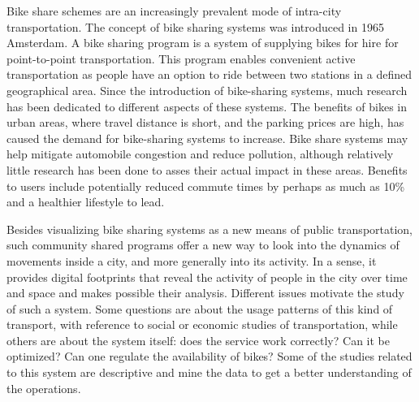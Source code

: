 \label{sec:overview}
Bike share schemes are an increasingly prevalent mode of intra-city transportation. The concept of bike sharing systems was introduced in 1965 Amsterdam. A bike sharing program is a system of supplying bikes for hire for point-to-point transportation. This program enables convenient active transportation as people have an option to ride between two stations in a defined geographical area. Since the introduction of bike-sharing systems, much research has been dedicated to different aspects of these systems. The benefits of bikes in urban areas, where travel distance is short, and the parking prices are high, has caused the demand for bike-sharing systems to increase. Bike share systems may help mitigate automobile congestion and reduce pollution, although relatively little research has been done to asses their actual impact in these areas. Benefits to users include potentially reduced commute times by perhaps as much as 10\% \cite{Sakari:2013:Data} and a healthier lifestyle to lead. 
 
Besides visualizing bike sharing systems as a new means of public transportation, such community shared programs offer a new way to look into the dynamics of movements inside a city, and more generally into its activity. In a sense, it provides digital footprints that reveal the activity of people in the city over time and space and makes possible their analysis. Different issues motivate the study of such a system. Some questions are about the usage patterns of this kind of transport, with reference to social or economic studies of transportation, while others are about the system itself: does the service work correctly? Can it be optimized? Can one regulate the availability of bikes? Some of the studies related to this system are descriptive and mine the data to get a better understanding of the operations. 

